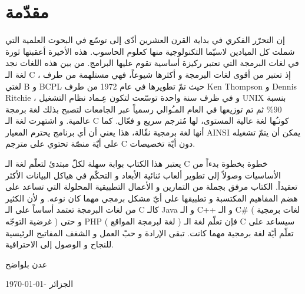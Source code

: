 \chapter*{مقدّمة}
إن التحرّر الفكري في بداية القرن العشرين أدّى إلى توسّع في البحوث العلمية التي شملت كل الميادين لاسيّما التكنولوجية منها كعلوم الحاسوب. هذه الأخيرة أعقبتها ثورة في لغات البرمجة التي تعتبر ركيزة أساسية تقوم عليها البرامج. من بين هذه اللغات نجد لغة الـ
\textenglish{C}
، إذ تعتبر من أقوى لغات البرمجة و أكثرها شيوعاً، فهي مستلهمة من طرف لغتي
 \textenglish{B}
 و
 \textenglish{BCPL}
حيث تمّ تطويرها في عام 1972 من طرف
\textenglish{Ken Thompson}
 و
 \textenglish{Dennis Ritchie}
، و في ظرف سنة واحدة توسّعت لتكون عِـماد نظام التشغيل
\textenglish{UNIX}
 بنسبة
 90\%
ثم تم توزيعها في العام المـُوالي رسمياً عبر الجامعات لتصبح بذلك لغة برمجة عالمية. و اشتهرت لغة الـ
\textenglish{C}
 كونـُها لغة عالية المستوى، لها مُترجم سريع و فعّال. كما أنها لغة برمجية نقّالة، هذا يعني أن أي برنامج يحترم المعيار
\textenglish{AINSI}
 يمكن أن يتمّ تشغيله على أيّة منصّة تحتوي على مترجم
\textenglish{C}
 دون أيّة تخصيصات.

يعتبر هذا الكتاب بوابة سهلة لكلّ مبتدئ لتعلّم لغة الـ
\textenglish{C}
 خطوة بخطوة بدءاً من الأساسيات وصولاً إلى تطوير ألعاب ثنائية الأبعاد و التحكّم في هياكل البيانات الأكثر تعقيداً. الكتاب مرفق بجملة من التمارين و الأعمال التطبيقية المحلولة التي تساعد على هضم المفاهيم المكتسبة و تطبيقها على أيّ مشكل برمجي مهما كان نوعه. و لأن الكثير من لغات البرمجة تعتمد أساساً على الـ
\textenglish{C}
كالـ
\textenglish{Java}
و الـ
\textenglish{C++}
 و الـ
\textenglish{C\#}
 ( لغات برمجية غرضية التوجّه ) و حتى
 \textenglish{PHP}
 ( لغة لبرمجة المواقع ) فإن تعلّم لغة الـ
\textenglish{C}
 سيساعد على تعلّم أيّة لغة برمجية مهما كانت. تبقى الإرادة و حبّ العمل و الشغف المفاتيح الرئيسية للنجاح و الوصول إلى الاحترافية.

\vspace{3em}
\hfill عدن بلواضح

\hfill \today - الجزائر
